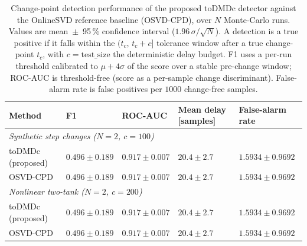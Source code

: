 \begin{table}[t]
  \centering
  \caption{Change-point detection performance of the proposed toDMDc detector against the OnlineSVD reference baseline (OSVD-CPD), over $N$ Monte-Carlo runs. Values are mean~$\pm$~95\,\% confidence interval ($1.96\,\sigma/\sqrt{N}$). A detection is a true positive if it falls within the $(t_c,\,t_c+c]$ tolerance window after a true change-point $t_c$, with $c=\text{test\_size}$ the deterministic delay budget. F1 uses a per-run threshold calibrated to $\mu+4\sigma$ of the score over a stable pre-change window; ROC-AUC is threshold-free (score as a per-sample change discriminant). False-alarm rate is false positives per $1000$ change-free samples.}
  \label{tab:m2-cpd}
  \begin{tabular}{lllll}
    \toprule
    Method & F1 & ROC-AUC & Mean delay [samples] & False-alarm rate \\
    \midrule
    \multicolumn{5}{l}{\textit{Synthetic step changes ($N=2$, $c=100$)}} \\
    toDMDc (proposed) & $0.496 \pm 0.189$ & $0.917 \pm 0.007$ & $20.4 \pm 2.7$ & $1.5934 \pm 0.9692$ \\
    OSVD-CPD & $0.496 \pm 0.189$ & $0.917 \pm 0.007$ & $20.4 \pm 2.7$ & $1.5934 \pm 0.9692$ \\
    \midrule
    \multicolumn{5}{l}{\textit{Nonlinear two-tank ($N=2$, $c=200$)}} \\
    toDMDc (proposed) & $0.496 \pm 0.189$ & $0.917 \pm 0.007$ & $20.4 \pm 2.7$ & $1.5934 \pm 0.9692$ \\
    OSVD-CPD & $0.496 \pm 0.189$ & $0.917 \pm 0.007$ & $20.4 \pm 2.7$ & $1.5934 \pm 0.9692$ \\
    \bottomrule
  \end{tabular}
\end{table}
